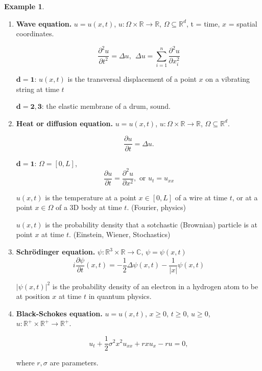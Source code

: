 \documentclass[12pt]{article}
\theoremstyle{definition}
\newtheorem*{warning}{Warning}
\newtheorem*{example*}{Example}
\begin{document}
\begin{example*}
\begin{enumerate}[label=\alph*)]
It is of $2$\textsuperscript{nd} order, linear.

\begin{warning}
In general, linear combinations of solutions are not solutions!
\end{warning}

\item \textbf{Wave equation.} $u=u(x,t)$, $u:\Omega\times\mathbb{R}\rightarrow\mathbb{R}$, $\Omega\subseteq\mathbb{R}^d$, t = time, $x$ = spatial coordinates.

\[\frac{\partial^2u}{\partial t^2}=\Delta u,\ \ \Delta u=\sum_{i=1}^n\frac{\partial^2u}{\partial x_i^2}\]

$\boldsymbol{d=1}$: $u(x,t)$ is the transversal displacement of a point $x$ on a vibrating string at time $t$

$\boldsymbol{d=2,3}$: the elastic membrane of a drum, sound.

\item \textbf{Heat or diffusion equation.} $u=u(x,t)$, $u:\Omega\times\mathbb{R}\rightarrow\mathbb{R}$, $\Omega\subseteq\mathbb{R}^d$.

\[\frac{\partial u}{\partial t}=\Delta u.\]

$\boldsymbol{d=1}$: $\Omega=[0,L]$,
\[\frac{\partial u}{\partial t}=\frac{\partial^2u}{\partial x^2},\text{ or }u_t=u_{xx}\]

$u(x,t)$ is the temperature at a point $x\in[0,L]$ of a wire at time $t$, or at a point $x\in\Omega$ of a 3D body at time $t$. (Fourier, physics)

$u(x,t)$ is the probability density that a sotchastic (Brownian) particle is at point $x$ at time $t$. (Einstein, Wiener, Stochastics)

\item \textbf{Schr\"{o}dinger equation.} $\psi:\mathbb{R}^3\times\mathbb{R}\rightarrow\mathbb{C}$, $\psi=\psi(x,t)$
\[i\frac{\partial\psi}{\partial t}(x,t)=-\frac{1}{2}\Delta\psi(x,t)-\frac{1}{|x|}\psi(x,t)\]

$|\psi(x,t)|^2$ is the probability density of an electron in a hydrogen atom to be at position $x$ at time $t$ in quantum physics.

\item \textbf{Black-Schokes equation.} $u=u(x,t)$, $x\geq0$, $t\geq0$, $u\geq0$, $u:\mathbb{R}^+\times\mathbb{R}^+\rightarrow\mathbb{R}^+$.

\[u_t+\frac{1}{2}\sigma^2x^2u_{xx}+rxu_x-ru=0,\]

where $r,\sigma$ are parameters.


\end{enumerate}
\end{example*}
\end{document}
